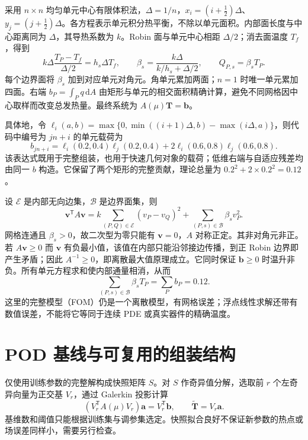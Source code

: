 采用 $n\times n$ 均匀单元中心有限体积法，$\Delta=1/n$，$x_i=(i+\tfrac12)\Delta$、$y_j=(j+\tfrac12)\Delta$。各方程表示单元积分热平衡，不除以单元面积。内部面长度与中心距离同为 $\Delta$，其导热系数为 $k$。Robin 面与单元中心相距 $\Delta/2$；消去面温度 $T_f$，得到
\begin{equation}
 k\Delta\frac{T_P-T_f}{\Delta/2}=h_s\Delta T_f,
 \qquad \beta_s=\frac{k\Delta}{k/h_s+\Delta/2},
 \qquad Q_{P,s}=\beta_sT_P.
 \label{eq:robin-face}
\end{equation}
每个边界面将 $\beta_s$ 加到对应单元对角元。角单元累加两面；$n=1$ 时唯一单元累加四面。右端 $b_P=\int_Pq\,\mathrm dA$ 由矩形与单元的相交面积精确计算，避免不同网格因中心取样而改变总发热量。最终系统为 $A(\mu)\boldsymbol T=\boldsymbol b$。

具体地，令 $\ell_i(a,b)=\max\{0,\min((i+1)\Delta,b)-\max(i\Delta,a)\}$，则代码中编号为 $jn+i$ 的单元载荷为
\begin{equation}
 b_{jn+i}=\ell_i(0.2,0.4)\ell_j(0.2,0.4)
       +2\ell_i(0.6,0.8)\ell_j(0.6,0.8).
 \label{eq:source-overlap}
\end{equation}
该表达式既用于完整组装，也用于快速几何对象的载荷；低维右端与自适应残差均由同一 $b$ 构造。它保留了两个矩形的完整贡献，理论总量为 $0.2^2+2\times0.2^2=0.12$。

设 $\mathcal E$ 是内部无向边集，$\mathcal B$ 是边界面集，则
\begin{equation}
 \boldsymbol v^{\mathsf T}A\boldsymbol v
 =k\sum_{(P,Q)\in\mathcal E}(v_P-v_Q)^2
  +\sum_{(P,s)\in\mathcal B}\beta_sv_P^2.
 \label{eq:energy}
\end{equation}
网格连通且 $\beta_s>0$，故二次型为零只能有 $\boldsymbol v=0$，$A$ 对称正定。其非对角元非正。若 $A\boldsymbol v\ge0$ 而 $\boldsymbol v$ 有负最小值，该值在内部只能沿邻接边传播，到正 Robin 边界即产生矛盾；因此 $A^{-1}\ge0$，即离散最大值原理成立。它同时保证 $\boldsymbol b\ge0$ 时温升非负。所有单元方程求和使内部通量相消，从而
\begin{equation}
 \sum_{(P,s)\in\mathcal B}\beta_sT_P=\sum_P b_P=0.12.
 \label{eq:conservation}
\end{equation}
这里的完整模型（FOM）仍是一个离散模型，有网格误差；浮点线性求解还带有数值误差，不能将它等同于连续 PDE 或真实器件的精确温度。

\section{POD 基线与可复用的组装结构}
仅使用训练参数的完整解构成快照矩阵 $S$。对 $S$ 作奇异值分解，选取前 $r$ 个左奇异向量为正交基 $V_r$，通过 Galerkin 投影计算
\begin{equation}
 (V_r^{\mathsf T}A(\mu)V_r)\boldsymbol a
   =V_r^{\mathsf T}\boldsymbol b,\qquad
 \widetilde{\boldsymbol T}=V_r\boldsymbol a.
 \label{eq:pod}
\end{equation}
基维数和阈值只能根据训练集与调参集选定。快照拟合良好不保证新参数的热点或场误差同样小，需要另行检查。

